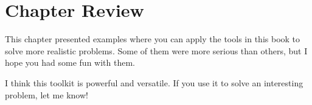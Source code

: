 \section{Chapter Review}

This chapter presented examples where you can apply the tools in this book to solve more realistic problems.  Some of them were more serious than others, but I hope you had some fun with them.

I think this toolkit is powerful and versatile.  If you use it to solve an interesting problem, let me know!
